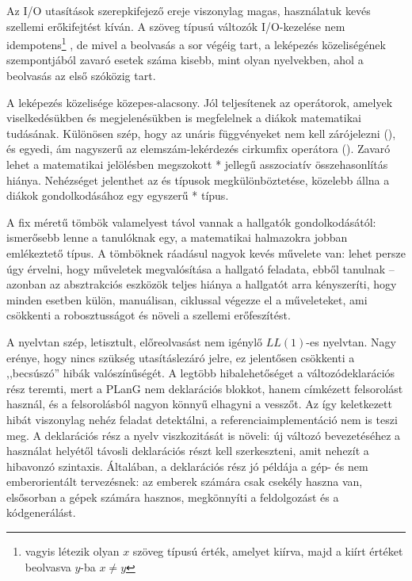 Az I/O utasítások szerepkifejező ereje viszonylag magas, használatuk kevés szellemi erőkifejtést kíván.
A szöveg típusú változók I/O-kezelése nem idempotens\footnote{%
vagyis létezik olyan $x$ szöveg típusú érték, amelyet kiírva, majd a kiírt értéket beolvasva $y$-ba $x \not= y$}%
, de mivel a beolvasás a sor végéig tart, a leképezés közeliségének szempontjából zavaró esetek száma kisebb, mint olyan nyelvekben, ahol a beolvasás az első szóközig tart. %

A leképezés közelisége közepes-alacsony.
Jól teljesítenek az operátorok, amelyek viselkedésükben és megjelenésükben is megfelelnek a diákok matematikai tudásának.
Különösen szép, hogy az unáris függvényeket nem kell zárójelezni (), és egyedi, ám nagyszerű az elemszám-lekérdezés cirkumfix operátora (). Zavaró lehet a matematikai jelölésben megszokott * jellegű asszociatív összehasonlítás hiánya.
Nehézséget jelenthet az  és  típusok megkülönböztetése, közelebb állna a diákok gondolkodásához egy egyszerű * típus.

A fix méretű tömbök valamelyest távol vannak a hallgatók gondolkodásától: ismerősebb lenne a tanulóknak egy, a matematikai halmazokra jobban emlékeztető típus.
A tömböknek ráadásul nagyok kevés művelete van: lehet persze úgy érvelni, hogy műveletek megvalósítása a hallgató feladata, ebből tanulnak -- azonban az absztrakciós eszközök teljes hiánya a hallgatót arra kényszeríti, hogy minden esetben külön, manuálisan, ciklussal végezze el a műveleteket, ami csökkenti a robosztusságot és növeli a szellemi erőfeszítést.

A nyelvtan szép, letisztult, előreolvasást nem igénylő $LL(1)$-es nyelvtan. Nagy erénye, hogy nincs szükség utasításlezáró jelre, ez jelentősen csökkenti a ,,becsúszó'' hibák\cite[ld.][4.2.2 rész]{McIver01} valószínűségét.
A legtöbb hibalehetőséget a változódeklarációs rész teremti, mert a PLanG nem deklarációs blokkot, hanem címkézett felsorolást használ, és a felsorolásból nagyon könnyű elhagyni a vesszőt.
Az így keletkezett hibát viszonylag nehéz feladat detektálni, a referenciaimplementáció nem is teszi meg.
A deklarációs rész a nyelv viszkozitását is növeli: új változó bevezetéséhez a használat helyétől távosli deklarációs részt kell szerkeszteni, amit nehezít a hibavonzó szintaxis.
Általában, a deklarációs rész jó példája a gép- és nem emberorientált tervezésnek: az emberek számára csak csekély haszna van, elsősorban a gépek számára hasznos, megkönnyíti a feldolgozást és a kódgenerálást.

